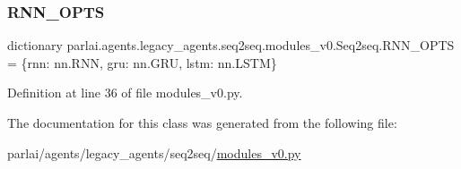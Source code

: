 \subsubsection{\texorpdfstring{R\+N\+N\+\_\+\+O\+P\+TS}{RNN\_OPTS}}
{\footnotesize\ttfamily dictionary parlai.\+agents.\+legacy\+\_\+agents.\+seq2seq.\+modules\+\_\+v0.\+Seq2seq.\+R\+N\+N\+\_\+\+O\+P\+TS = \{\textquotesingle{}rnn\textquotesingle{}\+: nn.\+R\+NN, \textquotesingle{}gru\textquotesingle{}\+: nn.\+G\+RU, \textquotesingle{}lstm\textquotesingle{}\+: nn.\+L\+S\+TM\}\hspace{0.3cm}{\ttfamily [static]}}



Definition at line 36 of file modules\+\_\+v0.\+py.



The documentation for this class was generated from the following file\+:\begin{DoxyCompactItemize}
\item 
parlai/agents/legacy\+\_\+agents/seq2seq/\hyperlink{seq2seq_2modules__v0_8py}{modules\+\_\+v0.\+py}\end{DoxyCompactItemize}
